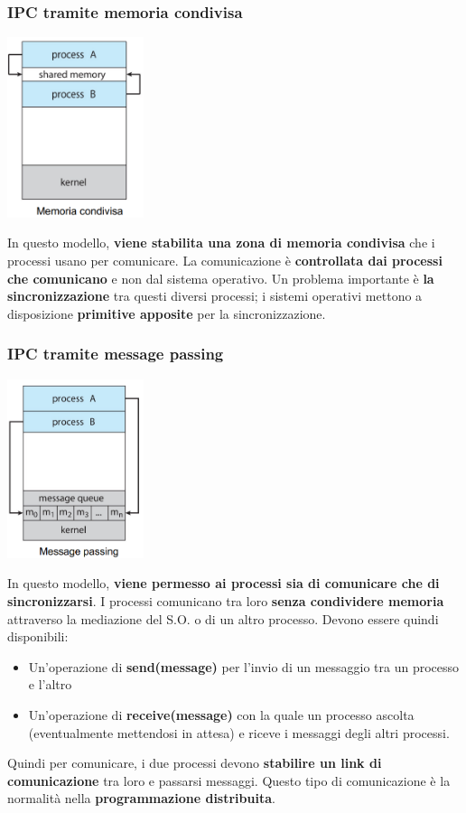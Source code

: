 \documentclass[12pt]{article}
\begin{document}
\subsubsection{IPC tramite memoria condivisa}
\begin{center}
    \includegraphics[width = 0.30\textwidth]{Images/58.PNG}
\end{center}
In questo modello, \textbf{viene stabilita una zona di memoria condivisa} che i processi usano per comunicare. La comunicazione è \textbf{controllata dai processi che comunicano} e non dal sistema operativo. Un problema importante è \textbf{la sincronizzazione} tra questi diversi processi; i sistemi operativi mettono a disposizione \textbf{primitive apposite} per la sincronizzazione.
\newpage
\subsubsection{IPC tramite message passing}
\begin{center}
    \includegraphics[width = 0.30\textwidth]{Images/59.PNG}
\end{center}
In questo modello, \textbf{viene permesso ai processi sia di comunicare che di sincronizzarsi}. I processi comunicano tra loro \textbf{senza condividere memoria} attraverso la mediazione del S.O. o di un altro processo. Devono essere quindi disponibili:
\begin{itemize}
    \item Un'operazione di \textbf{send(message)} per l'invio di un messaggio tra un processo e l'altro
    \item Un'operazione di \textbf{receive(message)} con la quale un processo ascolta (eventualmente mettendosi in attesa) e riceve i messaggi degli altri processi.
\end{itemize}
Quindi per comunicare, i due processi devono \textbf{stabilire un link di comunicazione} tra loro e passarsi messaggi. Questo tipo di comunicazione è la normalità nella \textbf{programmazione distribuita}.
\end{document}
